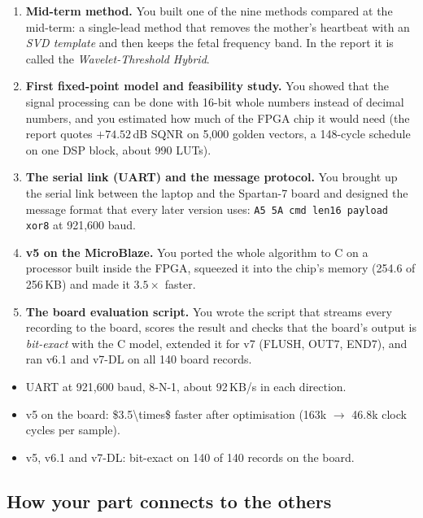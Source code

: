 \documentclass[11pt]{article}
\begin{document}
\begin{enumerate}
  \item \textbf{Mid-term method.} You built one of the nine methods compared at the mid-term: a single-lead method that removes the mother's heartbeat with an \emph{SVD template} and then keeps the fetal frequency band. In the report it is called the \emph{Wavelet-Threshold Hybrid}.
  \item \textbf{First fixed-point model and feasibility study.} You showed that the signal processing can be done with 16-bit whole numbers instead of decimal numbers, and you estimated how much of the FPGA chip it would need (the report quotes $+74.52$\,dB SQNR on 5,000 golden vectors, a 148-cycle schedule on one DSP block, about 990 LUTs).
  \item \textbf{The serial link (UART) and the message protocol.} You brought up the serial link between the laptop and the Spartan-7 board and designed the message format that every later version uses: \texttt{A5 5A cmd len16 payload xor8} at 921,600 baud.
  \item \textbf{v5 on the MicroBlaze.} You ported the whole algorithm to C on a processor built inside the FPGA, squeezed it into the chip's memory (254.6 of 256\,KB) and made it $3.5\times$ faster.
  \item \textbf{The board evaluation script.} You wrote the script that streams every recording to the board, scores the result and checks that the board's output is \emph{bit-exact} with the C model, extended it for v7 (FLUSH, OUT7, END7), and ran v6.1 and v7-DL on all 140 board records.
\end{enumerate}

\begin{keyfact}
\begin{itemize}
  \item UART at \num{921,600 baud}, 8-N-1, about 92\,KB/s in each direction.
  \item v5 on the board: \num{$3.5\times$ faster} after optimisation (163k $\to$ 46.8k clock cycles per sample).
  \item v5, v6.1 and v7-DL: \num{bit-exact on 140 of 140 records} on the board.
\end{itemize}
\end{keyfact}

\subsection*{How your part connects to the others}
\end{document}
